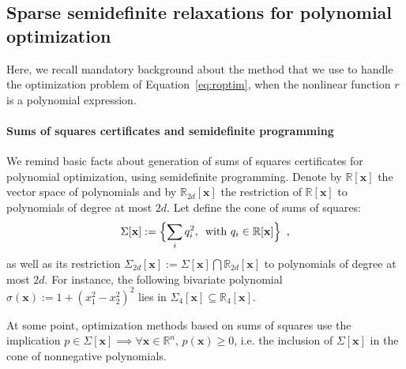 \documentclass[preprint]{sigplanconf}
\newcommand{\R}{\mathbb{R}}
\newcommand{\x}{\mathbf{x}}
\theoremstyle{plain}
\begin{document}
\subsection{Sparse semidefinite relaxations for polynomial optimization}
\label{sec:sdpbackground}
Here, we recall mandatory background about the method that we use to handle the optimization problem of Equation~\eqref{eq:roptim}, when the nonlinear function $r$ is a polynomial expression.

\paragraph{Sums of squares certificates and semidefinite programming}
We remind basic facts about generation of sums of squares certificates for polynomial optimization, using semidefinite programming.
Denote by $\R[\x]$ the vector space of polynomials and by $\R_{2 d}[\x]$ the restriction of $\R[\x]$ to polynomials of degree at most $2 d$. Let define the cone of sums of squares:
\begin{equation}
\label{eq:cone_sos}
\Sigma[\x] := \Bigl\{\sum_i q_i^2, \, \text{ with } q_i \in \R[\x] \Bigr\}\enspace,
\end{equation}
%
as well as its restriction $\Sigma_{2 d}[\x] := \Sigma[\x] \bigcap \R_{2 d}[\x]$ to polynomials of degree at most $2 d$. For instance, the following bivariate polynomial  $\sigma (\x) := 1 + (x_1^2 - x_2^2)^2$ lies in $\Sigma_4[\x] \subseteq \R_4[\x]$.

At some point, optimization methods based on sums of squares use the implication $p \in \Sigma[\x] \implies \forall \x \in \R^n, \, p(\x) \geq 0$, i.e. the inclusion of $\Sigma[\x]$ in the cone of nonnegative polynomials.
\end{document}

